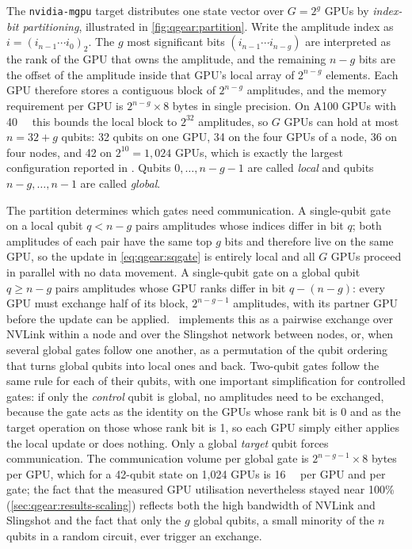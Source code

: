 The \texttt{nvidia-mgpu} target distributes one state vector over $G=2^{g}$ GPUs by \emph{index-bit partitioning}, illustrated in \cref{fig:qgear:partition}. Write the amplitude index as $i=(i_{n-1}\cdots i_{0})_{2}$. The $g$ most significant bits $(i_{n-1}\cdots i_{n-g})$ are interpreted as the rank of the GPU that owns the amplitude, and the remaining $n-g$ bits are the offset of the amplitude inside that GPU's local array of $2^{n-g}$ elements. Each GPU therefore stores a contiguous block of $2^{n-g}$ amplitudes, and the memory requirement per GPU is $2^{n-g}\times 8$ bytes in single precision. On A100 GPUs with \SI{40}{\giga\byte} this bounds the local block to $2^{32}$ amplitudes, so $G$ GPUs can hold at most $n = 32+g$ qubits: 32 qubits on one GPU, 34 on the four GPUs of a node, 36 on four nodes, and 42 on $2^{10}=1,024$ GPUs, which is exactly the largest configuration reported in \cite{guo2025qgear}. Qubits $0,\dots,n-g-1$ are called \emph{local} and qubits $n-g,\dots,n-1$ are called \emph{global}.

The partition determines which gates need communication. A single-qubit gate on a local qubit $q<n-g$ pairs amplitudes whose indices differ in bit $q$; both amplitudes of each pair have the same top $g$ bits and therefore live on the same GPU, so the update in \cref{eq:qgear:sqgate} is entirely local and all $G$ GPUs proceed in parallel with no data movement. A single-qubit gate on a global qubit $q\geq n-g$ pairs amplitudes whose GPU ranks differ in bit $q-(n-g)$: every GPU must exchange half of its block, $2^{n-g-1}$ amplitudes, with its partner GPU before the update can be applied. \cudaq\ implements this as a pairwise exchange over NVLink within a node and over the Slingshot network between nodes, or, when several global gates follow one another, as a permutation of the qubit ordering that turns global qubits into local ones and back. Two-qubit gates follow the same rule for each of their qubits, with one important simplification for controlled gates: if only the \emph{control} qubit is global, no amplitudes need to be exchanged, because the gate acts as the identity on the GPUs whose rank bit is 0 and as the target operation on those whose rank bit is 1, so each GPU simply either applies the local update or does nothing. Only a global \emph{target} qubit forces communication. The communication volume per global gate is $2^{n-g-1}\times 8$ bytes per GPU, which for a 42-qubit state on 1,024 GPUs is \SI{16}{\giga\byte} per GPU and per gate; the fact that the measured GPU utilisation nevertheless stayed near 100\% (\cref{sec:qgear:results-scaling}) reflects both the high bandwidth of NVLink and Slingshot and the fact that only the $g$ global qubits, a small minority of the $n$ qubits in a random circuit, ever trigger an exchange.


